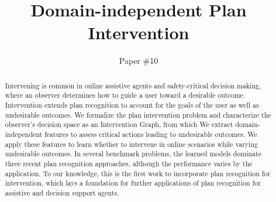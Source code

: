 \documentclass[letterpaper]{article}
\theoremstyle{plain}
\begin{document}
\title{Domain-independent Plan Intervention}
\author{ Paper \#10}
\newcommand{\debug}[2]{[\textbf{DEBUG #1}: \textcolor{WildStrawberry}{\textit{#2}}]}
\nocopyright
\maketitle
\begin{abstract}
Intervening is common in online assistive agents and safety-critical decision making, where an observer determines how to guide a user toward a desirable outcome.
Intervention extends plan recognition to account for the goals of the user as well as undesirable outcomes.
We formalize the plan intervention problem and characterize the observer's decision space as an Intervention Graph, from which 
We extract domain-independent features to assess critical actions leading to undesirable outcomes.
We apply these features to learn whether to intervene in online scenarios while varying undesirable outcomes.
In several benchmark problems, the learned models dominate three recent plan recognition approaches, although the performance varies by the application.
To our knowledge, this is the first work to incorporate plan recognition for intervention, which lays a foundation for further applications of plan recognition for assistive and decision support agents.
\end{abstract}

\end{document}
